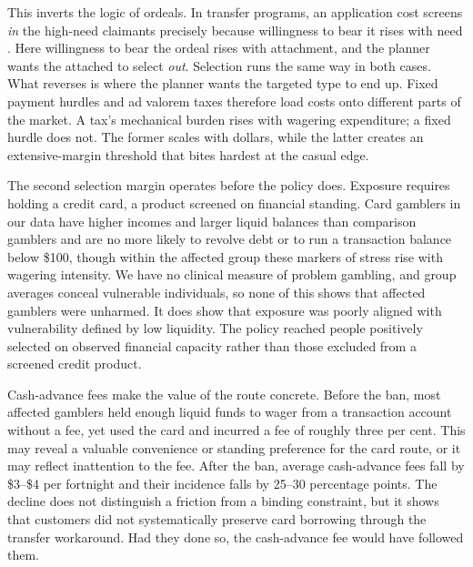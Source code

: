 \documentclass[12pt]{article}
\begin{document}
This inverts the logic of ordeals. In transfer programs, an application cost screens \emph{in} the high-need claimants precisely because willingness to bear it rises with need \citep{NicholsZeckhauser1982,AlatasEtAl2016_SelfTargeting,DeshpandeLi2019_ScreenedOut,ShepardWagner2025_Ordeals}. Here willingness to bear the ordeal rises with attachment, and the planner wants the attached to select \emph{out}. Selection runs the same way in both cases. What reverses is where the planner wants the targeted type to end up. Fixed payment hurdles and ad valorem taxes therefore load costs onto different parts of the market. A tax's mechanical burden rises with wagering expenditure; a fixed hurdle does not. The former scales with dollars, while the latter creates an extensive-margin threshold that bites hardest at the casual edge.

The second selection margin operates before the policy does. Exposure requires holding a credit card, a product screened on financial standing. Card gamblers in our data have higher incomes and larger liquid balances than comparison gamblers and are no more likely to revolve debt or to run a transaction balance below \$100, though within the affected group these markers of stress rise with wagering intensity. We have no clinical measure of problem gambling, and group averages conceal vulnerable individuals, so none of this shows that affected gamblers were unharmed. It does show that exposure was poorly aligned with vulnerability defined by low liquidity. The policy reached people positively selected on observed financial capacity rather than those excluded from a screened credit product.

Cash-advance fees make the value of the route concrete. Before the ban, most affected gamblers held enough liquid funds to wager from a transaction account without a fee, yet used the card and incurred a fee of roughly three per cent. This may reveal a valuable convenience or standing preference for the card route, or it may reflect inattention to the fee. After the ban, average cash-advance fees fall by \$3--\$4 per fortnight and their incidence falls by 25--30 percentage points. The decline does not distinguish a friction from a binding constraint, but it shows that customers did not systematically preserve card borrowing through the transfer workaround. Had they done so, the cash-advance fee would have followed them.
\end{document}
